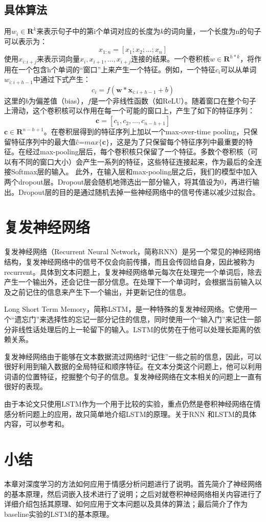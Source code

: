 \subsection{具体算法}
用$w_i\in \mathbf{R}^k$来表示句子中的第i个单词对应的长度为$k$的词向量，一个长度为n的句子可以表示为：
\begin{equation} \label{eq3.1}
x_{1:n} = [x_1; x_2;...; x_n]
\end{equation}
使用$x_{i:i+j}$来表示词向量$x_i, x_{i+1}, …, x_{i+j}$连接的结果。一个卷积核$w\in \mathbf{R}^{h*k}$，将作用在一个包含h个单词的“窗口”上来产生一个特征。例如，一个特征$c_i$可以从单词$w_{i:i+h-1}$中通过下式产生：
\begin{equation} \label{eq3.2}
c_i = f(\textbf{w}*\textbf{x}_{i:i+h-1} + b)
\end{equation}	
这里的$b$为偏差值（bias），$f$是一个非线性函数（如ReLU）。随着窗口在整个句子上滑动，这个卷积核可以作用在每一个可能的窗口上，产生了如下的特征序列：
\begin{equation} \label{eq3.3}
\textbf{c} = [c_1, c_2, ..., c_{n-h+1}]
\end{equation}	
$\textbf{c}\in\mathbf{R}^{n-h+1}$。在卷积层得到的特征序列上加以一个max-over-time pooling，只保留特征序列中的最大值\^{c}=$max\{\textbf{c}\}$，这是为了只保留每个特征序列中最重要的特征。在经过max-pooling层后，每个卷积核只保留了一个特征。多数个卷积核（可以有不同的窗口大小）会产生一系列的特征，这些特征连接起来，作为最后的全连接Softmax层的输入。
此外，在输入层和max-pooling层之后，我们的模型中加入两个dropout层。Dropout层会随机地筛选出一部分输入，将其值设为0，再进行输出。Dropout层的目的是通过随机去掉一些神经网络中的信号传递以减少过拟合。

\section{复发神经网络}
复发神经网络（Recurrent Neural Network，简称RNN）是另一个常见的神经网络结构，复发神经网络中的信号不仅会向前传播，而且会传回给自身，因此被称为recurrent。具体到文本问题上，复发神经网络单元每次在处理完一个单词后，除去产生一个输出外，还会记住一部分信息。在处理下一个单词时，会根据当前输入以及之前记住的信息来产生下一个输出，并更新记住的信息。

Long Short Term Memory，简称LSTM，是一种特殊的复发神经网络。它使用一个“遗忘门”来选择性的忘记一部分记住的信息，同时使用一个“输入门”来记住一部分非线性话处理后的上一轮留下的输入。LSTM的优势在于他可以处理长距离的依赖关系。

复发神经网络由于能够在文本数据流过网络时“记住”一些之前的信息，因此，可以很好利用到输入数据的全局特征和顺序特征。在文本分类这个问题上，他可以利用词语的位置特征，挖掘整个句子的信息。复发神经网络在文本相关的问题上一直有很好的表现。

由于本论文只使用LSTM作为一个用于比较的实验，重点仍然是卷积神经网络在情感分析问题上的应用，故只简单地介绍LSTM的原理。关于RNN 和LSTM的具体内容，可以参考\cite{socher.2013.recursive}和\cite{sundermeyer2012lstm}。

\section{小结}
本章对深度学习的方法如何应用于情感分析问题进行了说明。首先简介了神经网络的基本原理，然后词嵌入技术进行了说明；之后对就卷积神经网络相关内容进行了详细介绍包括其原理、如何应用于文本问题以及具体的算法；最后简介了作为baseline实验的LSTM的基本原理。
